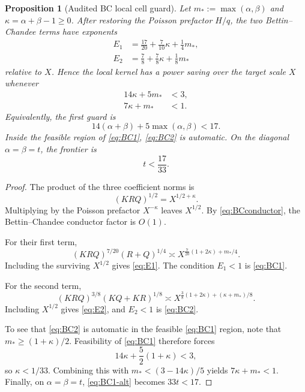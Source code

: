 \documentclass[11pt]{article}
\newtheorem{proposition}[theorem]{Proposition}
\theoremstyle{definition}
\theoremstyle{remark}
\newcommand{\1}{\mathbf 1}
\begin{document}
\begin{proposition}[Audited BC local cell guard]\label{prop:bc-guard}
Let \(m_*:=\max(\alpha,\beta)\) and \(\kappa=\alpha+\beta-1\ge0\).  After restoring the Poisson prefactor \(H/q\), the two Bettin--Chandee terms have exponents
\begin{align}
 E_1&=\frac{17}{20}+\frac7{10}\kappa+\frac14m_*,\label{eq:E1}\\
 E_2&=\frac78+\frac78\kappa+\frac18m_*\label{eq:E2}
\end{align}
relative to \(X\).  Hence the local kernel has a power saving over the target scale \(X\) whenever
\begin{align}
 14\kappa+5m_*&<3,\label{eq:BC1}\\
 7\kappa+m_*&<1.\label{eq:BC2}
\end{align}
Equivalently, the first guard is
\begin{equation}\label{eq:BC1-alt}
 14(\alpha+\beta)+5\max(\alpha,\beta)<17.
\end{equation}
Inside the feasible region of \eqref{eq:BC1}, \eqref{eq:BC2} is automatic.  On the diagonal \(\alpha=\beta=t\), the frontier is
\begin{equation}\label{eq:17-33}
 t<\frac{17}{33}.
\end{equation}
\end{proposition}

\begin{proof}
The product of the three coefficient norms is
\[
 (KRQ)^{1/2}=X^{1/2+\kappa}.
\]
Multiplying by the Poisson prefactor \(X^{-\kappa}\) leaves \(X^{1/2}\).  By \eqref{eq:BCconductor}, the Bettin--Chandee conductor factor is \(O(1)\).

For their first term,
\[
 (KRQ)^{7/20}(R+Q)^{1/4}
 \asymp
 X^{\frac7{20}(1+2\kappa)+m_*/4}.
\]
Including the surviving \(X^{1/2}\) gives \eqref{eq:E1}.  The condition \(E_1<1\) is \eqref{eq:BC1}.

For the second term,
\[
 (KRQ)^{3/8}(KQ+KR)^{1/8}
 \asymp
 X^{\frac38(1+2\kappa)+(\kappa+m_*)/8}.
\]
Including \(X^{1/2}\) gives \eqref{eq:E2}, and \(E_2<1\) is \eqref{eq:BC2}.

To see that \eqref{eq:BC2} is automatic in the feasible \eqref{eq:BC1} region, note that \(m_*\ge(1+\kappa)/2\).  Feasibility of \eqref{eq:BC1} therefore forces
\[
 14\kappa+\frac52(1+\kappa)<3,
\]
so \(\kappa<1/33\).  Combining this with \(m_*<(3-14\kappa)/5\) yields \(7\kappa+m_*<1\).  Finally, on \(\alpha=\beta=t\), \eqref{eq:BC1-alt} becomes \(33t<17\).
\end{proof}
\end{document}
